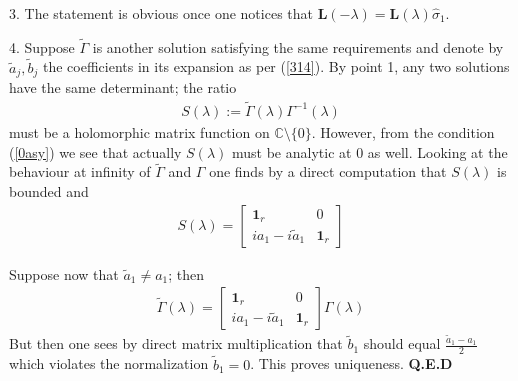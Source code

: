 \documentclass{article}
\def\L{{\mathbf L}}
\def \C{{\mathbf C}}
\def\s{\sigma}
\def\C{{\mathbb C}}
\def\1{\mathbf 1}
\def\wh{\widehat}
\def\wt{\widetilde}
\def\QED{ {\bf Q.E.D}\par \vskip 4pt}
\newcommand{\be}{\begin{eqnarray}}
\newcommand{\ee}{\end{eqnarray}}
\def\le{\left}
\def\ri{\right}
\begin{document}
3. The statement is obvious once one notices that $\L(-\lambda) =\L(\lambda)\wh \s_1$.

4. Suppose $\wt \Gamma$ is another solution satisfying the same requirements and denote by $\wt a_j, \wt b_j$ the coefficients in its expansion as per (\ref{314}).  By point 1, any two solutions have the same determinant; the ratio
\be
S(\lambda):= \wt \Gamma (\lambda) \Gamma^{-1}(\lambda) 
\ee
must be a holomorphic matrix  function on $\C\setminus \{0\}$.
However, from the condition (\ref{0asy}) we see that actually $S(\lambda)$ must be analytic at $0$ as well. 
 Looking at the behaviour at infinity of $\wt \Gamma$ and $\Gamma$ one finds by a direct computation that $S(\lambda)$ is bounded and 
\be
S(\lambda) = \le[
\begin{array}{cc}
\1_r & 0\\
i a_1 -i\wt a_1 & \1_r
\end{array}
\ri]
\ee

Suppose now that $\wt a_1\neq a_1$; then 
\be
\wt \Gamma(\lambda) = \le[
\begin{array}{cc}
\1_r & 0\\
i a_1 -i\wt a_1 & \1_r
\end{array}
\ri] \Gamma(\lambda)
\ee
But then one sees by direct matrix multiplication that $\wt b_1$ should equal $\frac {\wt a_1-a_1}{2}$ which violates the normalization $\wt b_1=0$. This proves uniqueness.
\QED
\end{document}
